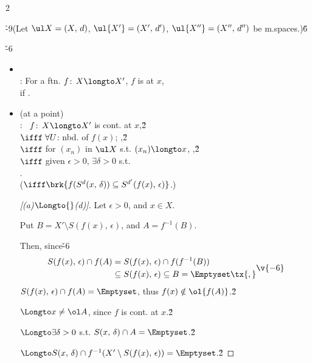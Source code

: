 \documentclass[dvipdfmx,a4paper,titlepage,9pt]{jsarticle}
\begin{document}
\begin{multicols*}{2}
\vfill\null\columnbreak


\h{-9}(Let $\ul X=(X,\,d)$, $\ul{X'}=(X',\,d')$, $\ul{X''}=(X'',\,d'')$ be m.spaces.)\v6

\v{-6}
\begin{itemize}[label=-]
\item{} \\
: For a ftn. $f\!:\,X\longto X'$, $f$ is  at $x$,\\
\;\;if .\\

\item{} {\color{TGreen}(at a point)}\\
: \qquad\, $f\!:\,X\longto X'$ is cont. at $x$,\v2\\
\;\;$\ifff\;\forall U$: nbd. of $f(x)$; ,\v2\\
\;\;$\ifff\;$for $(x_n)$ in $\ul X$ s.t. $(x_n)\longto x$, ,\v2\\
\;\;$\ifff\;$given $\epsilon>0$, $\exists\delta>0$ s.t.\\
\;\;\qquad {}.\\
\;\;\qquad($\ifff\brk{f(S^d(x,\,\delta))\subseteq S^{d'}(f(x),\,\epsilon)}$.)

\begin{pfbox}
\rnc{\qedsymbol}{\Sq}
\begin{proof}[{[(a)${}\Longto{}$(d)]}]
Let $\epsilon>0$, and $x\in X$.

Put $B=X'\setminus S(f(x),\,\epsilon)$, and $A=f^{-1}(B)$.

Then, since\v{-6}
$$\begin{aligned}S(f(x),\,\epsilon)\cap f(A)&=S(f(x),\,\epsilon)\cap f(f^{-1}(B)) \\
&\subseteq S(f(x),\,\epsilon)\subseteq B=\Emptyset\tx{,}\end{aligned}\v{-6}$$
$S(f(x),\,\epsilon)\cap f(A)=\Emptyset$, thus $f(x)\notin\ol{f(A)}$.\v2

$\Longto x\neq\ol A$, since $f$ is cont. at $x$.\v2

$\Longto \exists\delta>0$ s.t. $S(x,\,\delta)\cap A=\Emptyset$.\v2

$\Longto S(x,\,\delta)\cap f^{-1}(X'\setminus S(f(x),\,\epsilon))=\Emptyset$.\v2


\end{proof}
\end{pfbox}
\end{itemize}
\end{multicols*}
\end{document}
